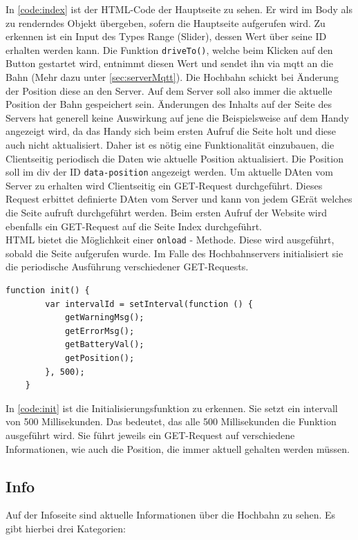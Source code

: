 In \autoref{code:index} ist der HTML-Code der Hauptseite zu sehen. Er wird im Body als zu renderndes Objekt übergeben, sofern die Hauptseite aufgerufen wird. Zu erkennen ist ein Input des Types Range (Slider), dessen Wert über seine ID erhalten werden kann. Die Funktion \texttt{driveTo()}, welche beim Klicken auf den Button gestartet wird, entnimmt diesen Wert und sendet ihn via \acrshort{mqtt} an die Bahn (Mehr dazu unter \autoref{sec:serverMqtt}). Die Hochbahn schickt bei Änderung der Position diese an den Server. Auf dem Server soll also immer die aktuelle Position der Bahn gespeichert sein. Änderungen des Inhalts auf der Seite des Servers hat generell keine Auswirkung auf jene die Beispielsweise auf dem Handy angezeigt wird, da das Handy sich beim ersten Aufruf die Seite holt und diese auch nicht aktualisiert. Daher ist es nötig eine Funktionalität einzubauen, die Clientseitig periodisch die Daten wie aktuelle Position aktualisiert. Die Position soll im div der ID \texttt{data-position} angezeigt werden. Um aktuelle DAten vom Server zu erhalten wird Clientseitig ein GET-Request durchgeführt. Dieses Request erbittet definierte DAten vom Server und kann von jedem GErät welches die Seite aufruft durchgeführt werden. Beim ersten Aufruf der Website wird ebenfalls ein GET-Request auf die Seite Index durchgeführt. \\
HTML bietet die Möglichkeit einer \texttt{onload} - Methode. Diese wird ausgeführt, sobald die Seite aufgerufen wurde. Im Falle des Hochbahnservers initialisiert sie die periodische Ausführung verschiedener GET-Requests. 
\vspace{0.5cm}
\begin{lstlisting}[language=html, style=dhpaperdefault]
	function init() {
		var intervalId = setInterval(function () {
			getWarningMsg();
			getErrorMsg();
			getBatteryVal();
			getPosition();
		}, 500);
	}
\end{lstlisting}
\vspace{1cm}
In \autoref{code:init} ist die Initialisierungsfunktion zu erkennen. Sie setzt ein intervall von 500 Millisekunden. Das bedeutet, das alle 500 Millisekunden die Funktion ausgeführt wird. Sie führt jeweils ein GET-Request auf verschiedene Informationen, wie auch die Position, die immer aktuell gehalten werden müssen. 

\subsection{Info}
Auf der Infoseite sind aktuelle Informationen über die Hochbahn zu sehen. Es gibt hierbei drei Kategorien:

